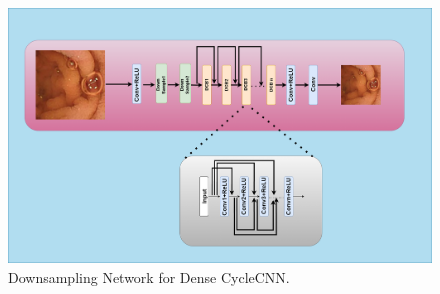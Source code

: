 \begin{figure}[H]
    \centering
    \includegraphics[totalheight=4in]{Chapter6/dense_cycle_Downsample.png}
    \caption[Downsampling Network for Dense CycleCNN]{Downsampling Network for Dense CycleCNN.}
    \label{fig:label6.6}
\end{figure}





